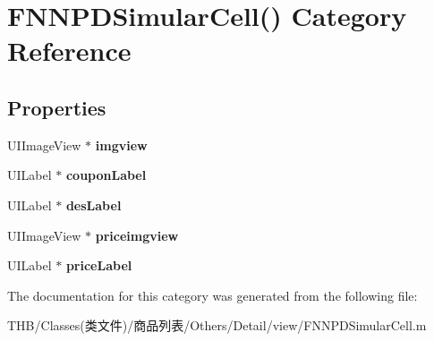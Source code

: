 \hypertarget{category_f_n_n_p_d_simular_cell_07_08}{}\section{F\+N\+N\+P\+D\+Simular\+Cell() Category Reference}
\label{category_f_n_n_p_d_simular_cell_07_08}
\subsection*{Properties}
\begin{DoxyCompactItemize}
\item 
\mbox{\label{category_f_n_n_p_d_simular_cell_07_08_acdabafeab4af90ebf1b5e374ab294654}} 
U\+I\+Image\+View $\ast$ {\bfseries imgview}
\item 
\mbox{\label{category_f_n_n_p_d_simular_cell_07_08_ad2fb8b1a025a2c282d8d64436c343017}} 
U\+I\+Label $\ast$ {\bfseries coupon\+Label}
\item 
\mbox{\label{category_f_n_n_p_d_simular_cell_07_08_a24897054b7e957e4cce209465655062f}} 
U\+I\+Label $\ast$ {\bfseries des\+Label}
\item 
\mbox{\label{category_f_n_n_p_d_simular_cell_07_08_ab3ee90cc5c22b410e350bcfc65c14ede}} 
U\+I\+Image\+View $\ast$ {\bfseries priceimgview}
\item 
\mbox{\label{category_f_n_n_p_d_simular_cell_07_08_a1d7a29b49bbd410ab7dcceb710bce03c}} 
U\+I\+Label $\ast$ {\bfseries price\+Label}
\end{DoxyCompactItemize}


The documentation for this category was generated from the following file\+:\begin{DoxyCompactItemize}
\item 
T\+H\+B/\+Classes(类文件)/商品列表/\+Others/\+Detail/view/F\+N\+N\+P\+D\+Simular\+Cell.\+m\end{DoxyCompactItemize}

